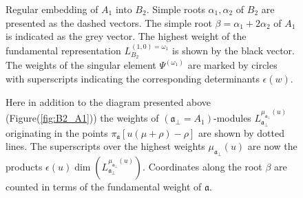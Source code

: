 \documentclass[12pt]{iopart}
\theoremstyle{definition}
\newcommand{\af}{\mathfrak{a}}
\newcommand{\afb}{\mathfrak{a}_{\bot}}
\begin{document}
\begin{figure}[p]
  \noindent{}
  \caption{Regular embedding of $A_1$ into $B_2$. Simple roots $\alpha_1, \alpha_2$ of $B_2$ are presented as the dashed vectors.
    The simple root $\beta = \alpha_1+2\alpha_2$ of $A_1$ is indicated as the grey vector.
    The highest weight of the fundamental representation $L^{(1,0)=\omega_1}_{B_2}$ is shown by the black vector.
    The weights of the singular element $\Psi^{(\omega_1)}$ are marked by circles with superscripts indicating
    the corresponding determinants $\epsilon(w)$.}
  \label{fig:B2_A1}

  \noindent{}
  \caption{Here in addition to the diagram presented above (Figure(\ref{fig:B2_A1}))
  the weights of $\left( \afb=A_1 \right)$-modules $L_{\af_{\perp }}^{\mu_{\af_{\perp }}\left( u\right) }$
  originating in the points $\pi _{\af}\left[ u(\mu +\rho )-\rho \right] $
are shown by dotted lines.
    The superscripts over the highest weights  $\mu_{\af_{\perp }}\left( u\right)$
    are now the products $\epsilon(u)\dim\left(L_{\af_{\perp }}^{\mu_{\af_{\perp }}\left( u\right) }\right)$.
    Coordinates along the root $\beta$ are counted in terms of the fundamental weight of $\af$. }
\label{fig:B2_A1_2}
\end{figure}
\end{document}
